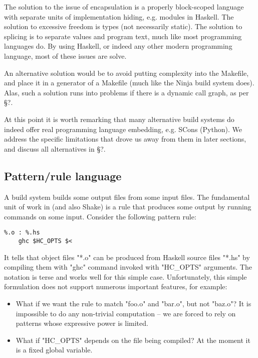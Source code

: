 The solution to the issue of encapsulation is a properly block-scoped language with separate units of implementation hiding, e.g. modules in Haskell. The solution to excessive freedom is types (not necessarily static). The solution to splicing is to separate values and program text, much like most programming languages do. By using Haskell, or indeed any other modern programming language, most of these issues are solve.

An alternative solution would be to avoid putting complexity into the Makefile, and place it in a generator of a Makefile (much like the Ninja build system does). Alas, such a solution runs into problems if there is a dynamic call graph, as per \S?.

At this point it is worth remarking that many alternative build systems do indeed offer real programming language embedding, e.g. SCons (Python). We address the specific limitations that drove us away from them in later sections, and discuss all alternatives in \S?.

\subsection{Pattern/rule language}

A build system builds some output files from some input files. The fundamental unit of work in \make{} (and also Shake) is a rule that produces some output by running commands on some input. Consider the following pattern rule:

\begin{lstlisting}
%.o : %.hs
    ghc $HC_OPTS $<
\end{lstlisting}

\noindent It tells \make{} that object files \lst"*.o" can be produced from Haskell source files \lst"*.hs" by compiling them with \lst"ghc" command invoked with \lst"HC_OPTS" arguments. The notation is terse and works well for this simple case. Unfortunately, this simple formulation does not support numerous important features, for example:

\begin{itemize}
\item What if we want the rule to match \lst"foo.o" and \lst"bar.o", but not \lst"baz.o"? It is impossible to do any non-trivial computation -- we are forced to rely on patterns whose expressive power is limited.
\item What if \lst"HC_OPTS" depends on the file being compiled? At the moment it is a fixed global variable.
\end{itemize}

